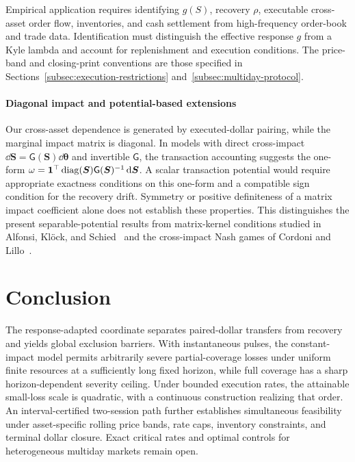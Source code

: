 \documentclass[review,hidelinks,onefignum,onetabnum]{siamonline250211}
\begin{document}
Empirical application requires identifying $g(S)$, recovery $\rho$, executable cross-asset order flow, inventories, and cash settlement from high-frequency order-book and trade data. Identification must distinguish the effective response $g$ from a Kyle lambda and account for replenishment and execution conditions. The price-band and closing-print conventions are those specified in Sections~\ref{subsec:execution-restrictions} and~\ref{subsec:multiday-protocol}.

\paragraph{Diagonal impact and potential-based extensions}
Our cross-asset dependence is generated by executed-dollar pairing, while the marginal impact matrix is diagonal. In models with direct cross-impact $\dd\bm S=\mathsf G(\bm S)\dd\bm\theta$ and invertible $\mathsf G$, the transaction accounting suggests the one-form $\omega=\mathbf{1}^\top\operatorname{diag}(\bm S)\mathsf G(\bm S)^{-1}\,\mathrm{d}\bm S$. A scalar transaction potential would require appropriate exactness conditions on this one-form and a compatible sign condition for the recovery drift. Symmetry or positive definiteness of a matrix impact coefficient alone does not establish these properties. This distinguishes the present separable-potential results from matrix-kernel conditions studied in Alfonsi, Kl\"ock, and Schied~\citep{AlfonsiKlockSchied2016} and the cross-impact Nash games of Cordoni and Lillo~\citep{CordoniLillo2024}.

\section{Conclusion}\label{sec:conclusion}
The response-adapted coordinate separates paired-dollar transfers from recovery and yields global exclusion barriers. With instantaneous pulses, the constant-impact model permits arbitrarily severe partial-coverage losses under uniform finite resources at a sufficiently long fixed horizon, while full coverage has a sharp horizon-dependent severity ceiling. Under bounded execution rates, the attainable small-loss scale is quadratic, with a continuous construction realizing that order. An interval-certified two-session path further establishes simultaneous feasibility under asset-specific rolling price bands, rate caps, inventory constraints, and terminal dollar closure. Exact critical rates and optimal controls for heterogeneous multiday markets remain open.
\end{document}
